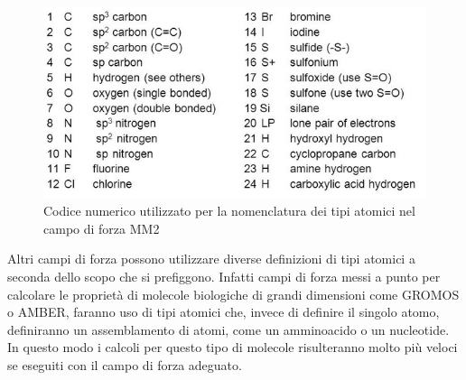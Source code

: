 \documentclass[oneside]{amsbook}
\numberwithin{section}{chapter}
\numberwithin{equation}{section}
\numberwithin{figure}{section}
\begin{document}
\begin{figure} [H]
\label{mm2at}
\centering
\caption{Codice numerico utilizzato per la nomenclatura dei tipi atomici  nel campo di forza MM2}
\includegraphics[scale=0.3]{mm2at}
\end{figure}
Altri campi di forza possono utilizzare diverse definizioni di tipi  atomici a seconda dello scopo che si prefiggono. Infatti campi di forza messi a punto per calcolare le proprietà di molecole biologiche di grandi dimensioni come GROMOS o AMBER, faranno uso di tipi atomici che, invece di definire il singolo atomo, definiranno un assemblamento di atomi, come un amminoacido o un nucleotide. In questo modo i calcoli per questo tipo di molecole risulteranno molto più veloci se eseguiti con il campo di forza adeguato.
\end{document}
